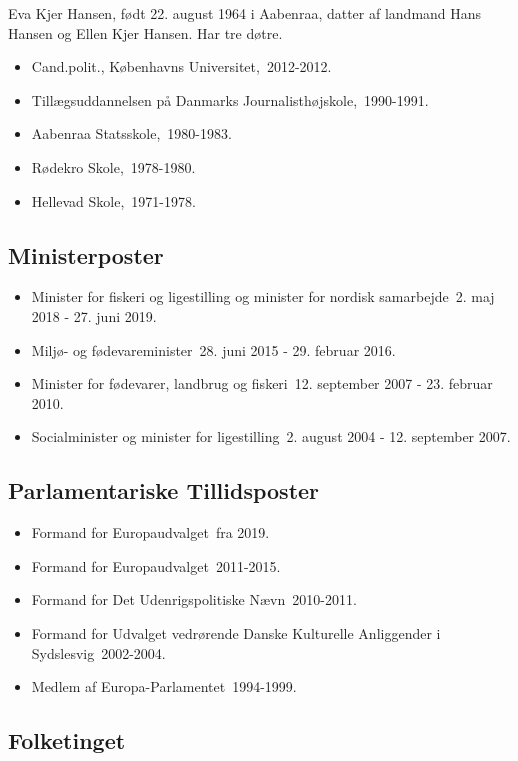 \documentclass[11pt, a4paper]{awesome-cv}
\begin{document}
\makecvheader[R]
\makelettertitle
\begin{cvletter}
Eva Kjer Hansen, født 22. august 1964 i Aabenraa, datter af landmand Hans Hansen og Ellen Kjer Hansen. Har tre døtre.

\begin{itemize}
\item Cand.polit., Københavns Universitet, 2012-2012.
\item Tillægsuddannelsen på Danmarks Journalisthøjskole, 1990-1991.
\item Aabenraa Statsskole, 1980-1983.
\item Rødekro Skole, 1978-1980.
\item Hellevad Skole, 1971-1978.
\end{itemize}
\subsection*{Ministerposter}
\begin{itemize}
\item Minister for fiskeri og ligestilling og minister for nordisk samarbejde 2. maj 2018 - 27. juni 2019.
\item Miljø- og fødevareminister 28. juni 2015 - 29. februar 2016.
\item Minister for fødevarer, landbrug og fiskeri 12. september 2007 - 23. februar 2010.
\item Socialminister og minister for ligestilling 2. august 2004 - 12. september 2007.
\end{itemize}
\subsection*{Parlamentariske Tillidsposter}
\begin{itemize}
\item Formand for Europaudvalget fra 2019.
\item Formand for Europaudvalget 2011-2015.
\item Formand for Det Udenrigspolitiske Nævn 2010-2011.
\item Formand for Udvalget vedrørende Danske Kulturelle Anliggender i Sydslesvig 2002-2004.
\item Medlem af Europa-Parlamentet 1994-1999.
\end{itemize}
\subsection*{Folketinget}

\end{cvletter}
\end{document}

